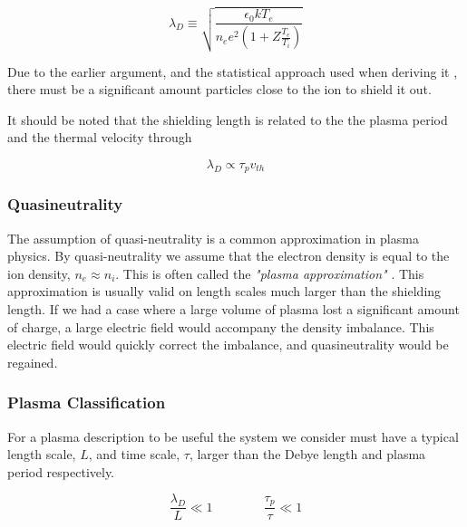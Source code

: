 		\begin{equation}
			\lambda_D \equiv \sqrt{\frac{\epsilon_0 k T_e}{n_e e^2(1+Z \frac{T_e}{T_i})}}
		\end{equation}

		Due to the earlier argument, and the statistical approach used when deriving it \citep{goldston_introduction_1995},
		there must be a significant amount particles close to the ion to shield it out.

		It should be noted that the shielding length is related \citep{fitzpatrick_plasma_2014} to the
		the plasma period and the thermal velocity through

		\begin{equation}
			\lambda_D \propto \tau_p v_{th}
		\end{equation}


		\subsubsection{Quasineutrality}
		The assumption of quasi-neutrality is a common approximation in plasma
		physics. By quasi-neutrality we assume that the electron
		density is equal to the ion density, \(n_e \approx n_i\). This is often called the
		\textit{"plasma approximation"} \citep{chen_introduction_1984}.
		This approximation is usually valid on length scales much larger than the shielding
		length. If we had a case where a large volume of plasma lost a significant
		amount of charge, a large electric field would accompany the density imbalance.
		This electric field would quickly correct the imbalance, and quasineutrality
		would be regained.

		\subsubsection{Plasma Classification}
        For a plasma description to be useful the system we consider must have
        a typical length scale, \(L\), and time scale, \(\tau\), larger than the Debye length and plasma
        period respectively.

        \[\frac{\lambda_D}{L} \ll 1  \qquad{} \qquad \frac{\tau_p}{\tau} \ll 1 \]


















